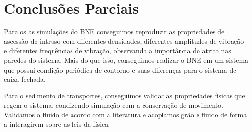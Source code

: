 
\chapter{Conclusões Parciais}
\label{chap:Conclusao}

    Para os as simulações do BNE conseguimos reproduzir as propriedades de ascessão do intruso com diferentes densidades, diferentes amplitudes de vibração e diferentes frequências de vibração, observando a importância do atrito nas paredes do sistema. Mais do que isso, conseguimos realizar o BNE em um sistema que possui condição periódica de contorno e suas diferenças para o sistema de caixa fechada.

    Para o sedimento de transportes, conseguimos validar as propriedades físicas que regem o sistema, condizendo simulação com a conservação de movimento. Validamos o fluido de acordo com a literatura e acoplamos grão e fluido de forma a interagirem sobre as leis da física.






